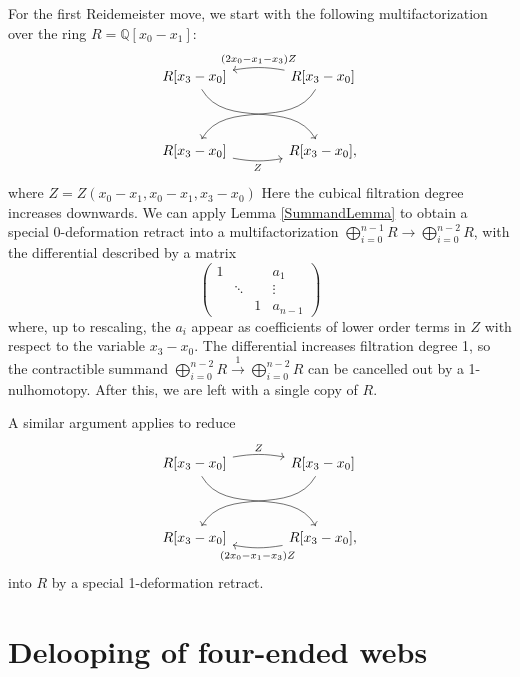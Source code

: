 \documentclass{article}
\newcommand{\Q}{\mathbb{Q}}
\theoremstyle{plain} %
\theoremstyle{definition} %
\theoremstyle{remark} %
\begin{document}
 For the first Reidemeister move, we start with the following multifactorization over the ring $R=\Q[x_0-x_1]$:
 $$\begin{tikzcd}[column sep=large, ]
     R[x_3-x_0]\ar[ddr, out=-60, in=120]&R[x_3-x_0] \ar[l,"(2x_0-x_1-x_3)Z", bend right=10, swap]\arrow[ddl, out=-120, in=60] \\\\
     R[x_3-x_0]\ar[r,"Z", bend right=10, swap]&R[x_3-x_0],
 \end{tikzcd}$$
 where $Z=Z(x_0-x_1,x_0-x_1,x_3-x_0)$
 Here the cubical filtration degree increases downwards. We can apply Lemma \ref{SummandLemma} to obtain a special 0-deformation retract into a multifactorization
 $\bigoplus_{i=0}^{n-1} R \to \bigoplus_{i=0}^{n-2}R$, with the differential described by a matrix
 $$\left(\begin{array}{cccc} 1  &&&a_1\\&\ddots&&\vdots \\&&1&a_{n-1}
 \end{array}\right)$$
 where, up to rescaling, the $a_i$ appear as coefficients of lower order terms in $Z$ with respect to the variable $x_3-x_0$. The differential increases filtration degree 1, so the contractible summand $\bigoplus_{i=0}^{n-2} R \xrightarrow{1} \bigoplus_{i=0}^{n-2}R$ can be cancelled out by a 1-nulhomotopy. After this, we are left with a single copy of $R$.


 A similar argument applies to reduce
 $$\begin{tikzcd}[column sep=large, ]
     R[x_3-x_0]\ar[ddr, out=-60, in=120]\ar[r,"Z", bend left=10]&R[x_3-x_0] \arrow[ddl, out=-120, in=60] \\\\
     R[x_3-x_0]&R[x_3-x_0]\ar[l,"(2x_0-x_1-x_3)Z", bend left=10],
 \end{tikzcd}$$
 into $R$ by a special 1-deformation retract.



 \section{Delooping of four-ended webs}
 
\end{document}
